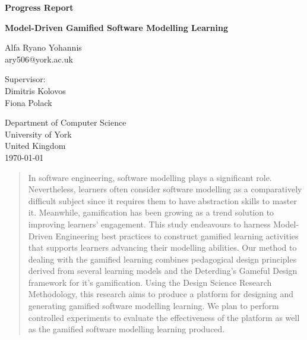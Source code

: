 \documentclass[12pt, a4paper]{report} \usepackage[titletoc]{appendix}
\begin{document}
\begin{titlepage}
 \begin{center}

\textbf{Progress Report}
\vspace{1cm}

\textbf{\large Model-Driven Gamified Software Modelling Learning}
\vspace{1cm}

Alfa Ryano Yohannis\\
ary506@york.ac.uk
\vspace{1cm}

Supervisor:\\
Dimitris Kolovos\\
Fiona Polack\\
\vspace{1cm}

Department of Computer Science\\
University of York\\
United Kingdom\\
\vspace{1cm}
\today
 
\vfill
 
\end{center}
\end{titlepage}


\begin{abstract}
In software engineering, software modelling plays a significant role.
Nevertheless, learners often consider software modelling as a comparatively 
difficult subject since it requires them to have abstraction skills to master it. 
Meanwhile, gamification has been growing as a trend solution to improving learners' engagement. This study endeavours to harness Model-Driven Engineering best practices to construct gamified learning activities that supports learners advancing their modelling abilities. Our method to dealing with the gamified learning combines pedagogical design principles derived from several learning models and the Deterding's Gameful Design framework for it's gamification. Using the Design Science Research Methodology, this research aims to produce a platform for designing and generating gamified software modelling learning. We plan to perform controlled experiments to evaluate the effectiveness of the platform as well as the gamified software modelling learning produced.
\end{abstract}

\tableofcontents
{}
\end{document}
